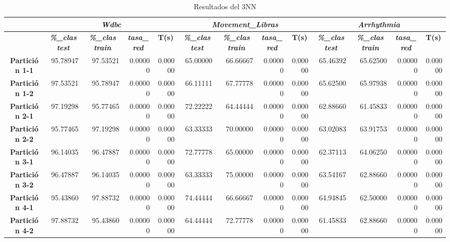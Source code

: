 \documentclass[a4paper,11pt]{article}
\begin{document}
 \begin{table}[H]
 \caption*{Resultados del 3NN}
    \begin{adjustbox}{width=1.1\textwidth}
    \begin{tabular}{|c|r|r|r|r|r|r|r|r|r|r|r|r|}
    \hline
    \multicolumn{1}{|l|}{} & \multicolumn{ 4}{c|}{\textbf{\textit{Wdbc}}} & \multicolumn{ 4}{c|}{\textbf{\textit{Movement\_Libras}}} & \multicolumn{ 4}{c|}{\textbf{\textit{Arrhythmia}}} \\ \hline
    & \multicolumn{1}{c|}{\textbf{\textit{\%\_clas test}}} & \multicolumn{1}{c|}{\textbf{\textit{\%\_clas train}}} & \multicolumn{1}{c|}{\textbf{\textit{tasa\_red}}} & \multicolumn{1}{c|}{\textbf{T(s)}} & \multicolumn{1}{c|}{\textbf{\textit{\%\_clas test}}} & \multicolumn{1}{c|}{\textbf{\textit{\%\_clas train}}} & \multicolumn{1}{c|}{\textbf{\textit{tasa\_red}}} & \multicolumn{1}{c|}{\textbf{T(s)}} & \multicolumn{1}{c|}{\textbf{\textit{\%\_clas test}}} & \multicolumn{1}{c|}{\textbf{\textit{\%\_clas train}}} & \multicolumn{1}{c|}{\textbf{\textit{tasa\_red}}} & \multicolumn{1}{c|}{\textbf{T(s)}} \\ \hline
    \textbf{Partición 1-1} & 95.78947 & 97.53521 & 0.00000 & 0.00000 & 65.00000 & 66.66667 & 0.00000 & 0.00000 & 65.46392 & 65.62500 & 0.00000 & 0.00000 \\ \hline
    \textbf{Partición 1-2} & 97.53521 & 95.78947 & 0.00000 & 0.00000 & 66.11111 & 67.77778 & 0.00000 & 0.00000 & 65.62500 & 65.97938 & 0.00000 & 0.00000 \\ \hline
    \textbf{Partición 2-1} & 97.19298 & 95.77465 & 0.00000 & 0.00000 & 72.22222 & 64.44444 & 0.00000 & 0.00000 & 62.88660 & 61.45833 & 0.00000 & 0.00000 \\ \hline
    \textbf{Partición 2-2} & 95.77465 & 97.19298 & 0.00000 & 0.00000 & 63.33333 & 70.00000 & 0.00000 & 0.00000 & 63.02083 & 63.91753 & 0.00000 & 0.00000 \\ \hline
    \textbf{Partición 3-1} & 96.14035 & 96.47887 & 0.00000 & 0.00000 & 72.77778 & 65.00000 & 0.00000 & 0.00000 & 62.37113 & 64.06250 & 0.00000 & 0.00000 \\ \hline
    \textbf{Partición 3-2} & 96.47887 & 96.14035 & 0.00000 & 0.00000 & 63.33333 & 75.00000 & 0.00000 & 0.00000 & 63.54167 & 62.88660 & 0.00000 & 0.00000 \\ \hline
    \textbf{Partición 4-1} & 95.43860 & 97.88732 & 0.00000 & 0.00000 & 74.44444 & 66.66667 & 0.00000 & 0.00000 & 64.94845 & 62.50000 & 0.00000 & 0.00000 \\ \hline
    \textbf{Partición 4-2} & 97.88732 & 95.43860 & 0.00000 & 0.00000 & 64.44444 & 72.77778 & 0.00000 & 0.00000 & 61.45833 & 62.88660 & 0.00000 & 0.00000 \\ \hline

\end{tabular}
\end{adjustbox}
\end{table}
\end{document}
